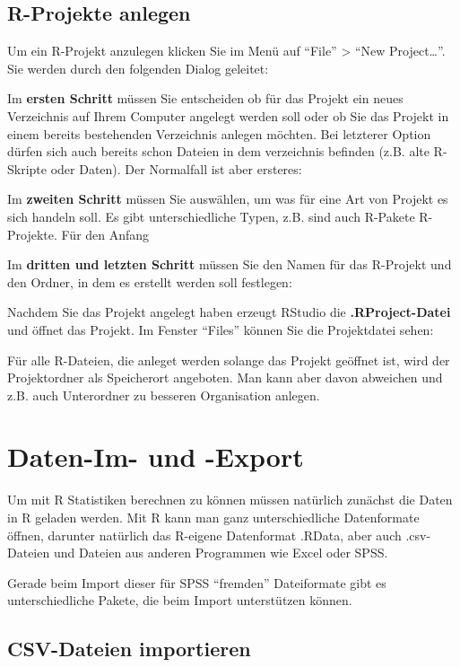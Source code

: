 \documentclass[
]{book}
\begin{document}
\hypertarget{r-projekte-anlegen}{%
\subsection{R-Projekte anlegen}\label{r-projekte-anlegen}}

Um ein R-Projekt anzulegen klicken Sie im Menü auf ``File'' \textgreater{} ``New Project\ldots{}''. Sie werden durch den folgenden Dialog geleitet:

Im \textbf{ersten Schritt} müssen Sie entscheiden ob für das Projekt ein neues Verzeichnis auf Ihrem Computer angelegt werden soll oder ob Sie das Projekt in einem bereits bestehenden Verzeichnis anlegen möchten. Bei letzterer Option dürfen sich auch bereits schon Dateien in dem verzeichnis befinden (z.B. alte R-Skripte oder Daten). Der Normalfall ist aber ersteres:

Im \textbf{zweiten Schritt} müssen Sie auswählen, um was für eine Art von Projekt es sich handeln soll. Es gibt unterschiedliche Typen, z.B. sind auch R-Pakete R-Projekte. Für den Anfang

Im \textbf{dritten und letzten Schritt} müssen Sie den Namen für das R-Projekt und den Ordner, in dem es erstellt werden soll festlegen:

Nachdem Sie das Projekt angelegt haben erzeugt RStudio die \textbf{.RProject-Datei} und öffnet das Projekt. Im Fenster ``Files'' können Sie die Projektdatei sehen:

Für alle R-Dateien, die anleget werden solange das Projekt geöffnet ist, wird der Projektordner als Speicherort angeboten. Man kann aber davon abweichen und z.B. auch Unterordner zu besseren Organisation anlegen.

\hypertarget{daten-im--und--export}{%
\section{Daten-Im- und -Export}\label{daten-im--und--export}}

Um mit R Statistiken berechnen zu können müssen natürlich zunächst die Daten in R geladen werden. Mit R kann man ganz unterschiedliche Datenformate öffnen, darunter natürlich das R-eigene Datenformat .RData, aber auch .csv-Dateien und Dateien aus anderen Programmen wie Excel oder SPSS.

Gerade beim Import dieser für SPSS ``fremden'' Dateiformate gibt es unterschiedliche Pakete, die beim Import unterstützen können.

\hypertarget{csv-dateien-importieren}{%
\subsection{CSV-Dateien importieren}\label{csv-dateien-importieren}}
\end{document}
